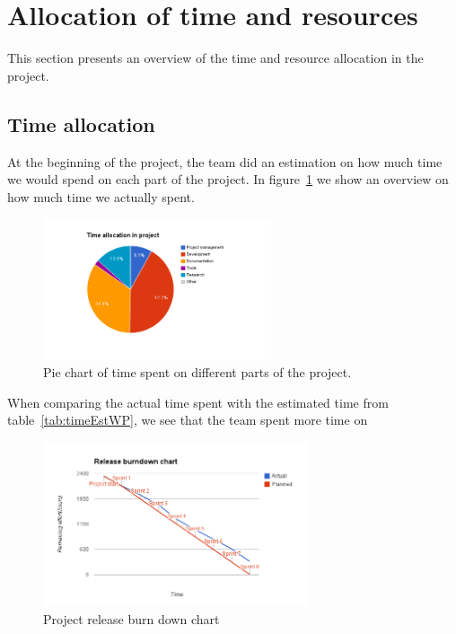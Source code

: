 \section{Allocation of time and resources}
This section presents an overview of the time and resource allocation in the project.

\subsection{Time allocation}
At the beginning of the project, the team did an estimation on how much time we would spend on each part of the project. In figure~\ref{fig:piechart} we show an overview on how much time we actually spent.

\begin{figure}[H]
\centering
\includegraphics[width=0.6\textwidth, clip, trim=4cm 2cm 4cm 1cm]{ch/retrospect/fig/timePie.png}
\caption{Pie chart of time spent on different parts of the project.}
\label{fig:piechart}
\end{figure}

When comparing the actual time spent with the estimated time from table~\ref{tab:timeEstWP}, we see that the team spent more time on 

\begin{figure}[H]
\centering
\includegraphics[width=0.7\textwidth, clip, trim=1.1cm 0.5cm 1.2cm 1cm]{ch/retrospect/fig/release.png}
\caption{Project release burn down chart}
\label{fig:release}
\end{figure}

